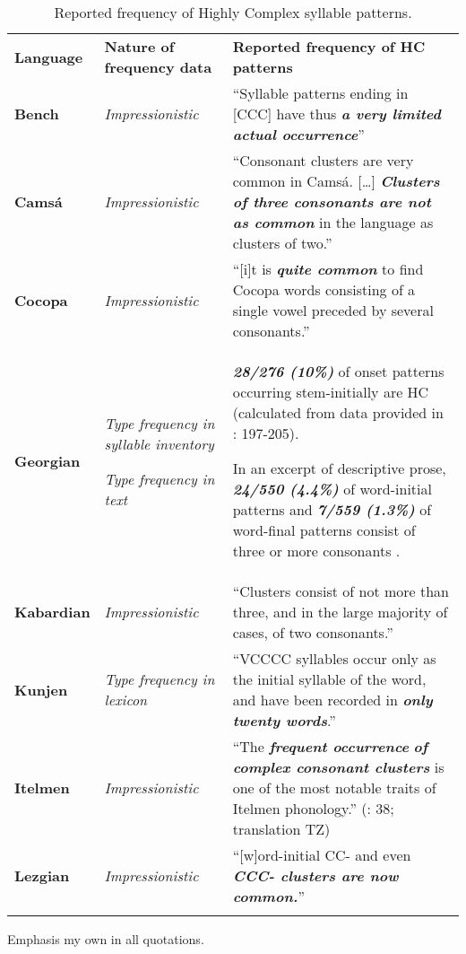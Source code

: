 \begin{table}
\begin{tabularx}{\textwidth}{XXX}
\lsptoprule

\textbf{Language} & \textbf{Nature of frequency data} & \textbf{Reported frequency of HC patterns}\\
{\bfseries Bench} & \textit{Impressionistic} & “Syllable patterns ending in [CCC] have thus \textbf{\textit{a very limited actual occurrence}}” \citep[92]{Rapold2006}\\
{\bfseries Camsá} & \textit{Impressionistic} & “Consonant clusters are very common in Camsá.\textbf{ }[…] \textbf{\textit{Clusters of three consonants are not as common} }in the language as clusters of two.” \citep[81-4]{Howard1967}\\
\textbf{Cocopa} & \textit{Impressionistic} & “[i]t is \textbf{\textit{quite common}} to find Cocopa words consisting of a single vowel preceded by several consonants.” \citep[1]{Bendixen1980}\\
\textbf{Georgian} & \textit{Type frequency in syllable inventory}

\textit{Type frequency in text} & \textbf{\textit{28/276 (10\%)} }of onset patterns occurring stem-initially are HC (calculated from data provided in \citealt{Butskhrikidze2002}: 197-205).

In an excerpt of descriptive prose, \textbf{\textit{24/550 (4.4\%)}} of word-initial patterns and \textbf{\textit{7/559 (1.3\%)}} of word-final patterns consist of three or more consonants \citep[79-80]{Vogt1958}.\\
\textbf{Kabardian} & \textit{Impressionistic} & “Clusters consist of not more than three, and in the large majority of cases, of two consonants.” \citep[29]{Kuipers1960}\\
\textbf{Kunjen} & \textit{Type frequency in lexicon} & “VCCCC syllables occur only as the initial syllable of the word, and have been recorded in \textbf{\textit{only twenty words}}.” \citep[35]{Sommer1969}\\
\textbf{Itelmen} & \textit{Impressionistic} & “The \textbf{\textit{frequent occurrence}} \textbf{\textit{of complex consonant clusters}} is one of the most notable traits of Itelmen phonology.” (\citealt{GeorgVolodin1999}: 38; translation TZ)\\
\textbf{Lezgian} & \textit{Impressionistic} & “[w]ord-initial CC- and even \textbf{\textit{CCC- clusters are now common.}}” 
\citep[46]{Haspelmath1993}\\
\lspbottomrule
\end{tabularx}
\caption{\label{tab:3.14}Reported frequency of Highly Complex syllable patterns.}Emphasis my own in all quotations.
\end{table}




